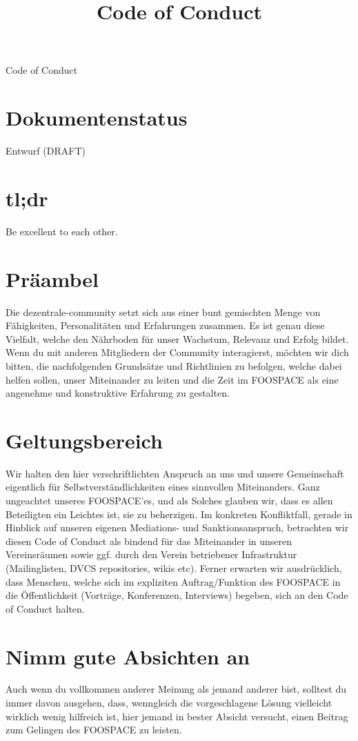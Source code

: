 \documentclass[10pt,a4paper]{article}
\newcommand{\qs}[1]{\glqq#1\grqq}
\newcommand{\name}{dezentrale}
\newcommand{\documentstatus}{Entwurf (DRAFT)}
\begin{document}
\title{Code of Conduct}

{\LARGE Code of Conduct}
\section*{Dokumentenstatus}
\documentstatus

\section*{tl;dr}
Be excellent to each other.

\section*{Pr{\"a}ambel}
Die \qs{\name}-community setzt sich aus einer bunt gemischten Menge von
F{\"a}higkeiten, Personalit{\"a}ten und Erfahrungen zusammen. Es ist genau diese
Vielfalt, welche den N{\"a}hrboden f{\"u}r unser Wachstum, Relevanz und Erfolg bildet.
Wenn du mit anderen Mitgliedern der Community interagierst, m{\"o}chten wir dich
bitten, die nachfolgenden Grunds{\"a}tze und Richtlinien zu befolgen, welche dabei helfen sollen,
unser Miteinander zu leiten und die Zeit im FOOSPACE als eine angenehme und
konstruktive Erfahrung zu gestalten.

\section*{Geltungsbereich}
Wir halten den hier verschriftlichten Anspruch an uns und unsere Gemeinschaft
eigentlich f{\"u}r Selbstverst{\"a}ndlichkeiten eines sinnvollen Miteinanders. Ganz
ungeachtet unseres FOOSPACE'es, und als Solches glauben wir, dass es allen
Beteiligten ein Leichtes ist, sie zu beherzigen. Im konkreten Konfliktfall,
gerade in Hinblick auf unseren eigenen Mediations- und Sanktionsanspruch,
betrachten wir diesen \qs{Code of Conduct} als bindend f{\"u}r das Miteinander in
unseren Vereinsr{\"a}umen sowie ggf. durch den Verein betriebener Infrastruktur
(Mailinglisten, DVCS repositories, wikis etc). Ferner erwarten wir ausdr{\"u}cklich,
dass Menschen, welche sich im expliziten Auftrag/Funktion des FOOSPACE in die
{\"O}ffentlichkeit (Vortr{\"a}ge, Konferenzen, Interviews) begeben, sich an den \qs{Code of
Conduct} halten.

\section{Nimm \qs{gute Absichten} an}
Auch wenn du vollkommen anderer Meinung als jemand anderer bist, solltest du
immer davon ausgehen, dass, wenngleich die vorgeschlagene L{\"o}sung vielleicht
wirklich wenig hilfreich ist, hier jemand in bester Absicht versucht, einen
Beitrag zum Gelingen des FOOSPACE zu leisten.
\end{document}
